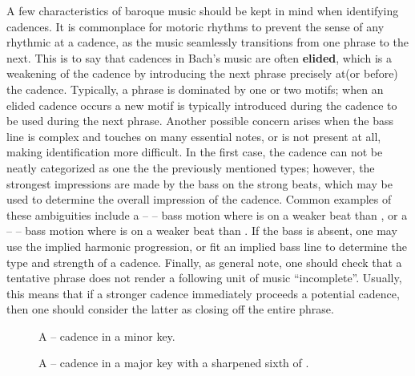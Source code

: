 A few characteristics of baroque music should be kept in mind when identifying cadences. It is commonplace for motoric rhythms to prevent the sense of any rhythmic  at a cadence, as the music seamlessly transitions from one phrase to the next. This is to say that cadences in Bach's music are often \textbf{elided}, which is a weakening of the cadence by introducing the next phrase precisely at(or before) the cadence. Typically, a phrase is dominated by one or two motifs; when an elided cadence occurs a new motif is typically introduced during the cadence to be used during the next phrase. Another possible concern arises when the bass line is complex and touches on many essential notes, or is not present at all, making identification more difficult. In the first case, the cadence can not be neatly categorized as one the the previously mentioned types; however, the strongest impressions are made by the bass on the strong beats, which may be used to determine the overall impression of the cadence. Common examples of these ambiguities include a  --  --  bass motion where  is on a weaker beat than , or a  --  --  bass motion where  is on a weaker beat than . If the bass is absent, one may use the implied harmonic progression, or fit an implied bass line to determine the type and strength of a cadence. Finally, as general note, one should check that a tentative phrase does not render a following unit of music “incomplete”. Usually, this means that if a stronger cadence immediately proceeds a potential cadence, then one should consider the latter as closing off the entire phrase.
\begin{figure}[h]
\centering
\begin{minipage}[t]{.475\textwidth}
\centering
{}
\end{minipage}
\hfill
\begin{minipage}[t]{.475\textwidth}
\centering
{}
\vspace{-16pt}
\end{minipage}
\begin{minipage}[t]{.4\textwidth}
\centering
\caption{A -- cadence in a minor key. }
\end{minipage}
\hspace{0.10\textwidth}
\begin{minipage}[t]{.4\textwidth}
\centering
\caption{A -- cadence in a major key with a sharpened sixth of . }
\end{minipage}
\end{figure}


